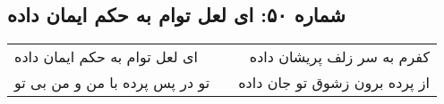 \begin{center}
\section*{شماره ۵۰: ای لعل توام به حکم ایمان داده}
\label{sec:050}
\begin{longtable}{l p{0.5cm} r}
ای لعل توام به حکم ایمان داده
&&
کفرم به سر زلف پریشان داده
\\
تو در پس پرده با من و من بی تو
&&
از پرده برون زشوق تو جان داده
\\
\end{longtable}
\end{center}
